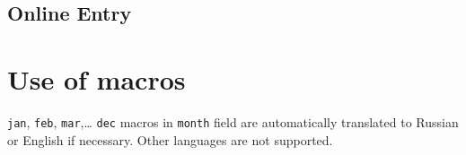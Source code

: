 \documentclass[a4paper]{article}
\begin{document}
\subsection{Online Entry}


\section{Use of macros}

\texttt{jan}, \texttt{feb}, \texttt{mar},\ldots{} \texttt{dec} macros in \texttt{month} field
are automatically translated to Russian or English if necessary. Other languages are not supported.
\end{document}
